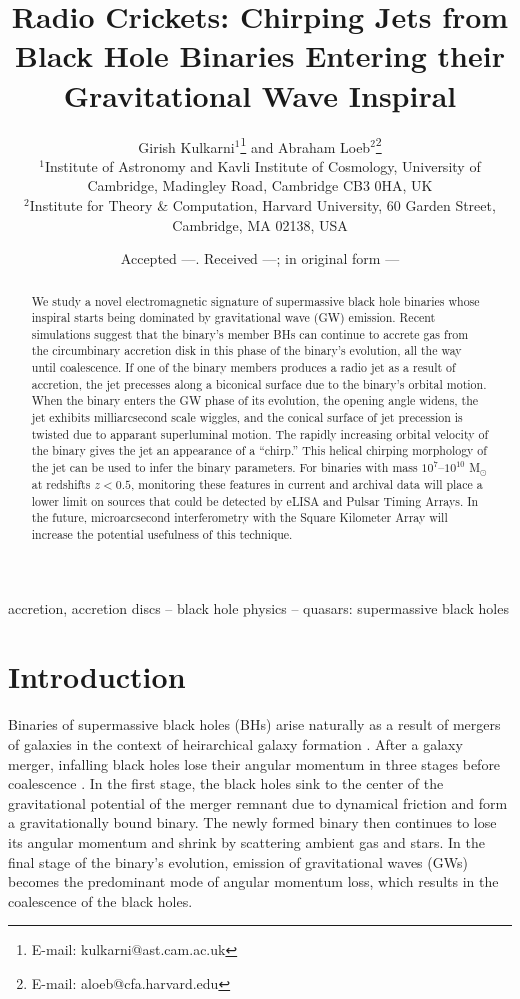 \documentclass[a4paper,fleqn,usenatbib]{mnras}
\title[Chirping Jets from Black Hole Binaries]{Radio Crickets:
  Chirping Jets from Black Hole Binaries Entering their Gravitational
  Wave Inspiral}
\author[Kulkarni and Loeb]{
Girish Kulkarni$^{1}$\thanks{E-mail: kulkarni@ast.cam.ac.uk}
and Abraham Loeb$^{2}$\thanks{E-mail: aloeb@cfa.harvard.edu}
\\
$^{1}$Institute of Astronomy and Kavli
  Institute of Cosmology, University of Cambridge, Madingley Road,
  Cambridge CB3 0HA, UK\\ 
$^{2}$Institute for Theory \& Computation,
  Harvard University, 60 Garden Street, Cambridge, MA 02138, USA\\ 
}
\date{Accepted ---. Received ---; in original form ---}
\begin{document}
\label{firstpage}
\pagerange{\pageref{firstpage}--\pageref{lastpage}}
\maketitle

\begin{abstract}
  We study a novel electromagnetic signature of supermassive black
  hole binaries whose inspiral starts being dominated by gravitational
  wave (GW) emission.  Recent simulations suggest that the binary's
  member BHs can continue to accrete gas from the circumbinary
  accretion disk in this phase of the binary's evolution, all the way
  until coalescence.  If one of the binary members produces a radio
  jet as a result of accretion, the jet precesses along a biconical
  surface due to the binary's orbital motion.  When the binary enters
  the GW phase of its evolution, the opening angle widens, the jet
  exhibits milliarcsecond scale wiggles, and the conical surface of
  jet precession is twisted due to apparant superluminal motion.  The
  rapidly increasing orbital velocity of the binary gives the jet an
  appearance of a ``chirp.''  This helical chirping morphology of the
  jet can be used to infer the binary parameters.  For binaries with
  mass $10^7$--$10^{10}$ M$_\odot$ at redshifts $z<0.5$, monitoring
  these features in current and archival data will place a lower limit
  on sources that could be detected by eLISA and Pulsar Timing Arrays.
  In the future, microarcsecond interferometry with the Square
  Kilometer Array will increase the potential usefulness of this
  technique.
\end{abstract}

\begin{keywords}
  accretion, accretion discs -- black hole physics -- quasars: supermassive black holes
\end{keywords}

\section{Introduction}
\label{sec:intro}

Binaries of supermassive black holes (BHs) arise naturally as a result
of mergers of galaxies in the context of heirarchical galaxy formation
\citep{2000MNRAS.311..576K, 2002MNRAS.336L..61H, 2008ApJ...676...33D,
  2012MNRAS.422.1306K}.  After a galaxy merger, infalling black holes
lose their angular momentum in three stages before coalescence
\citep{1980Natur.287..307B, 2005LRR.....8....8M, 2011ASL.....4..181C}.
In the first stage, the black holes sink to the center of the
gravitational potential of the merger remnant due to dynamical
friction and form a gravitationally bound binary.  The newly formed
binary then continues to lose its angular momentum and shrink by
scattering ambient gas and stars.  In the final stage of the binary's
evolution, emission of gravitational waves (GWs) becomes the
predominant mode of angular momentum loss, which results in the
coalescence of the black holes.
\end{document}
